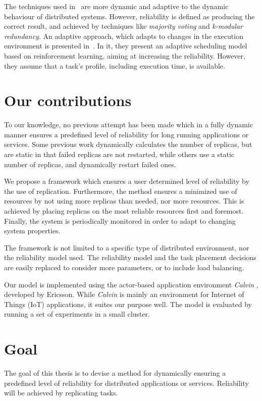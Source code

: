 \documentclass{cslthse-msc}
\begin{document}
The techniques used in~\cite{selfAdaptRel, dynAdaptRepl, relModelWebServices} are more dynamic and adaptive to the dynamic behaviour of distributed systems. However, reliability is defined as producing the correct result, and achieved by techniques like \emph{majority voting} and \emph{k-modular redundancy}. An adaptive approach, which adapts to changes in the execution environment is presented in~\cite{imprRelAdaptRL}. In it, they present an adaptive scheduling model based on reinforcement learning, aiming at increasing the reliability. However, they assume that a task's profile, including execution time, is available.

\section{Our contributions} \label{sec:introduction_contributions}
To our knowledge, no previous attempt has been made which in a fully dynamic manner ensures a predefined level of reliability for long running applications or services. Some previous work dynamically calculates the number of replicas, but are static in that failed replicas are not restarted, while others use a static number of replicas, and dynamically restart failed ones.

We propose a framework which ensures a user determined level of reliability by the use of replication. Furthermore, the method ensures a minimized use of resources by not using more replicas than needed, nor more resources. This is achieved by placing replicas on the most reliable resources first and foremost. Finally, the system is periodically monitored in order to adapt to changing system properties.

The framework is not limited to a specific type of distributed environment, nor the reliability model used. The reliability model and the task placement decisions are easily replaced to consider more parameters, or to include load balancing. 

Our model is implemented using the actor-based application environment \emph{Calvin} \cite{calvin}, developed by Ericsson. While \emph{Calvin} is mainly an environment for Internet of Things (IoT) applications, it suites our purpose well. The model is evaluated by running a set of experiments in a small cluster.

\section{Goal} \label{sec:introduction_goals}
The goal of this thesis is to devise a method for dynamically ensuring a predefined level of reliability for distributed applications or services. Reliability will be achieved by replicating tasks.
\end{document}
